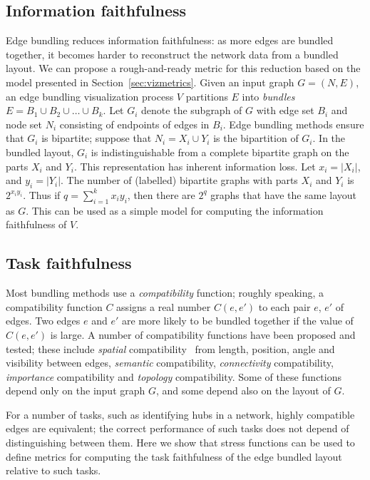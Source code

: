 \documentclass[10pt,journal,cspaper,compsoc]{IEEEtran}
\begin{document}
\subsection{Information faithfulness}
Edge bundling reduces information faithfulness: as more edges are bundled together, it becomes harder to reconstruct the network data from a bundled layout. We can propose a rough-and-ready metric for this reduction based on the model presented in Section~\ref{sec:vizmetrics}.
Given an input graph $G = (N,E)$, an edge bundling visualization process $V$ partitions $E$ into \emph{bundles} $E = B_1 \cup B_2 \cup \ldots \cup B_k$. Let $G_i$ denote the subgraph of $G$ with edge set $B_i$ and node set $N_i$ consisting of endpoints of edges in $B_i$. Edge bundling methods ensure that $G_i$ is bipartite; suppose that $N_i = X_i \cup Y_i$ is the bipartition of $G_i$. In the bundled layout, $G_i$ is indistinguishable from a complete bipartite graph on the parts $X_i$ and $Y_i$. This representation has inherent information loss. Let $x_i = | X_i |$, and $y_i = | Y_i |$. The number of (labelled) bipartite graphs with parts $X_i$ and $Y_i$ is $2^{x_i y_i}$. Thus if $q = \sum_{i=1}^k x_i y_i$, then there are $2^q$ graphs that have the same layout as $G$. This can be used as a simple model for computing the information faithfulness of $V$.

\subsection{Task faithfulness}
Most bundling methods use a \emph{compatibility} function; roughly speaking, a compatibility function $C$ assigns a real number $C(e, e')$ to each pair $e$, $e'$ of edges. Two edges $e$ and $e'$ are more likely to be bundled together if the value of $C(e,e')$ is large. A number of compatibility functions have been proposed and tested;  these include {\em spatial} compatibility~\cite{holten} from length, position, angle and visibility between edges, {\em semantic} compatibility, {\em connectivity} compatibility, {\em importance} compatibility and {\em topology} compatibility. Some of these functions depend only on the input graph $G$, and some depend also on the layout of $G$.

For a number of tasks, such as identifying hubs in a network, highly compatible edges are equivalent; the correct performance of such tasks does not depend of distinguishing between them. Here we show that stress functions can be used to define metrics for computing the task faithfulness of the edge bundled layout relative to such tasks.
\end{document}
